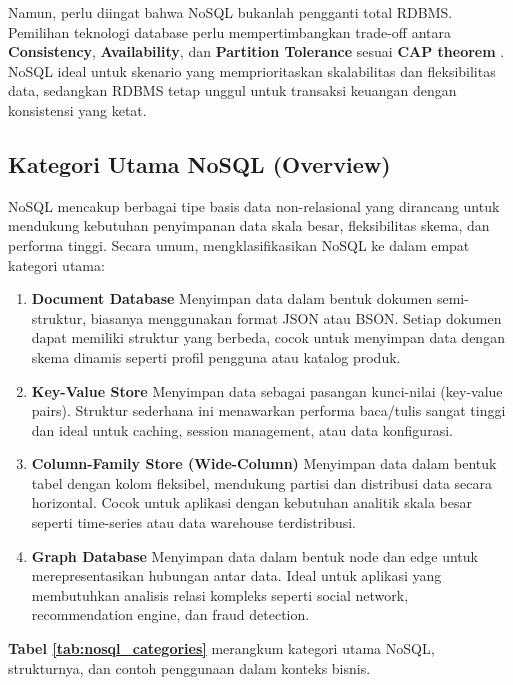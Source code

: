 Namun, perlu diingat bahwa NoSQL bukanlah pengganti total RDBMS. Pemilihan teknologi database perlu mempertimbangkan trade-off antara \textbf{Consistency}, \textbf{Availability}, dan \textbf{Partition Tolerance} sesuai \textbf{CAP theorem} \cite{brewer2012cap}. NoSQL ideal untuk skenario yang memprioritaskan skalabilitas dan fleksibilitas data, sedangkan RDBMS tetap unggul untuk transaksi keuangan dengan konsistensi yang ketat.



\subsection{Kategori Utama NoSQL (Overview)}

NoSQL mencakup berbagai tipe basis data non-relasional yang dirancang untuk mendukung kebutuhan penyimpanan data skala besar, fleksibilitas skema, dan performa tinggi. Secara umum, \cite{moniruzzaman2013nosql, han2011survey} mengklasifikasikan NoSQL ke dalam empat kategori utama:

\begin{enumerate}
	\item \textbf{Document Database}  
	Menyimpan data dalam bentuk dokumen semi-struktur, biasanya menggunakan format JSON atau BSON. Setiap dokumen dapat memiliki struktur yang berbeda, cocok untuk menyimpan data dengan skema dinamis seperti profil pengguna atau katalog produk.
	
	\item \textbf{Key-Value Store}  
	Menyimpan data sebagai pasangan kunci-nilai (key-value pairs). Struktur sederhana ini menawarkan performa baca/tulis sangat tinggi dan ideal untuk caching, session management, atau data konfigurasi.
	
	\item \textbf{Column-Family Store (Wide-Column)}  
	Menyimpan data dalam bentuk tabel dengan kolom fleksibel, mendukung partisi dan distribusi data secara horizontal. Cocok untuk aplikasi dengan kebutuhan analitik skala besar seperti time-series atau data warehouse terdistribusi.
	
	\item \textbf{Graph Database}  
	Menyimpan data dalam bentuk node dan edge untuk merepresentasikan hubungan antar data. Ideal untuk aplikasi yang membutuhkan analisis relasi kompleks seperti social network, recommendation engine, dan fraud detection.
\end{enumerate}

\textbf{Tabel \ref{tab:nosql_categories}} merangkum kategori utama NoSQL, strukturnya, dan contoh penggunaan dalam konteks bisnis.

